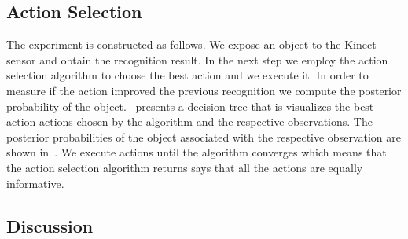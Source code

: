     \subsection{Action Selection}
        The experiment is constructed as follows. We expose an object to the Kinect sensor and obtain the recognition result. In the next step we employ the action selection algorithm to choose the best action and we execute it. In order to measure if the action improved the previous recognition we compute the posterior probability of the object.~ presents a decision tree that is visualizes the best action actions chosen by the algorithm and the respective observations. The posterior probabilities of the object associated with the respective observation are shown in~. We execute actions until the algorithm converges which means that the action selection algorithm returns says that all the actions are equally informative.

    \subsection{Discussion}
        
